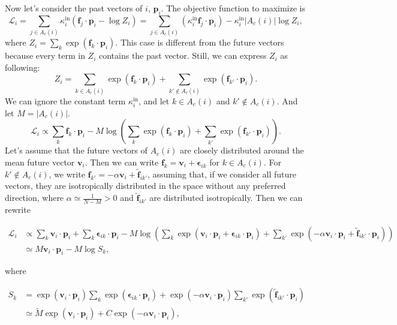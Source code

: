 \documentclass[12pt]{article}
\begin{document}
\begin{refsection}
Now let's consider the past vectors of $i$, $\mathbf{p}_i$. The objective function to maximize is $$\mathcal{L}_i = \sum_{j \in A_c(i)} \kappa_i^{\text{in}} \left( \mathbf{f}_j \cdot \mathbf{p}_i - \log Z_i \right) = \sum_{j \in A_c(i)} \left( \kappa_i^{\text{in}} \mathbf{f}_j \cdot \mathbf{p}_i \right) - \kappa_i^{\text{in}} |A_c(i)| \log Z_i ,$$ where $Z_i = \sum_k \exp(\mathbf{f}_k \cdot \mathbf{p}_i).$ This case is different from the future vectors because every term in $Z_i$ contains the past vector. Still, we can express $Z_i$ as following: $$Z_i = \sum_{k \in A_c(i)} \exp(\mathbf{f}_k \cdot \mathbf{p}_i) + \sum_{k' \notin A_c(i)} \exp(\mathbf{f}_{k'} \cdot \mathbf{p}_i).$$ We can ignore the constant term $\kappa_i^{\text{in}}$, and let $k \in A_c(i)$ and $k' \notin A_c(i)$. And let $M = | A_c(i) |$.  
$$\mathcal{L}_i \propto \sum_k \mathbf{f}_k \cdot \mathbf{p}_i - M \log \left(\sum_k \exp(\mathbf{f}_k \cdot \mathbf{p}_i) + \sum_{k'} \exp(\mathbf{f}_{k'} \cdot \mathbf{p}_i) \right).$$ Let's assume that the future vectors of $A_c(i)$ are closely distributed around the mean future vector $\mathbf{v}_i$. Then we can write $\mathbf{f}_k = \mathbf{v}_i + \mathbf{\epsilon}_{ik}$ for $k \in A_c(i)$. For $k' \notin A_c(i)$, we write $\mathbf{f}_{k'} = -\alpha \mathbf{v}_i + \tilde{\mathbf{f}}_{ik'}$, assuming that, if we consider all future vectors, they are isotropically distributed in the space without any preferred direction, where $\alpha \simeq \frac{1}{N-M} > 0$ and $\tilde{\mathbf{f}}_{ik'}$ are distributed isotropically. 
Then we can rewrite 

$$
\begin{aligned}\mathcal{L}_i &\propto \sum_k \mathbf{v}_i \cdot \mathbf{p}_i + \sum_k \mathbf{\epsilon}_{ik} \cdot \mathbf{p}_i - M \log \left( \sum_k \exp(\mathbf{v}_i \cdot \mathbf{p}_i + \mathbf{\epsilon}_{ik} \cdot \mathbf{p}_i) + \sum_{k'} \exp(-\alpha \mathbf{v}_i \cdot \mathbf{p}_i + \tilde{\mathbf{f}}_{ik'} \cdot \mathbf{p}_i ) \right)\\
&\simeq M \mathbf{v}_i \cdot \mathbf{p}_i - M \log S_k,
\end{aligned}$$


where 

$$\begin{aligned}S_k &= \exp(\mathbf{v}_i \cdot \mathbf{p}_i) \sum_k \exp(\mathbf{\epsilon}_{ik} \cdot \mathbf{p}_i) + \exp(-\alpha \mathbf{v}_i \cdot \mathbf{p}_i)\sum_{k'} \exp (\tilde{\mathbf{f}}_{ik'} \cdot \mathbf{p}_i)\\
&\simeq \tilde{M} \exp(\mathbf{v}_i \cdot \mathbf{p}_i) + C \exp(-\alpha \mathbf{v}_i \cdot \mathbf{p}_i),
\end{aligned}$$ 


\end{refsection}
\end{document}
